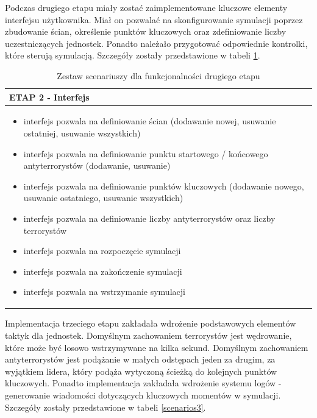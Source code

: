 Podczas drugiego etapu miały zostać zaimplementowane kluczowe elementy interfejsu użytkownika. Miał on pozwalać na skonfigurowanie symulacji poprzez zbudowanie ścian, określenie punktów kluczowych oraz zdefiniowanie liczby uczestniczących jednostek. Ponadto należało przygotować odpowiednie kontrolki, które sterują symulacją. Szczegóły zostały przedstawione w tabeli \ref{scenarios2}. 

\begin{table}
\begin{center}
\begin{tabular}{|p{}|}
\hline
ETAP 2 - Interfejs\\\hline
	\begin{itemize}
		\setlength\itemsep{0pt}
		\item interfejs pozwala na definiowanie ścian (dodawanie nowej, usuwanie ostatniej, usuwanie wszystkich)
		\item interfejs pozwala na definiowanie punktu startowego / końcowego antyterrorystów (dodawanie, usuwanie)
		\item interfejs pozwala na definiowanie punktów kluczowych (dodawanie nowego, usuwanie ostatniego, usuwanie wszystkich)
		\item interfejs pozwala na definiowanie liczby antyterrorystów oraz liczby terrorystów
		\item interfejs pozwala na rozpoczęcie symulacji
		\item interfejs pozwala na zakończenie symulacji
		\item interfejs pozwala na wstrzymanie symulacji
	\end{itemize}
\\\hline
\end{tabular}
\caption {Zestaw scenariuszy dla funkcjonalności drugiego etapu\label{scenarios2}}
\end{center}
\end{table} 

Implementacja trzeciego etapu zakładała wdrożenie podstawowych elementów taktyk dla jednostek. Domyślnym zachowaniem terrorystów jest wędrowanie, które może być losowo wstrzymywane na kilka sekund. Domyślnym zachowaniem antyterrorystów jest podążanie w małych odstępach jeden za drugim, za wyjątkiem lidera, który podąża wytyczoną ścieżką do kolejnych punktów kluczowych. Ponadto implementacja zakładała wdrożenie systemu logów - generowanie wiadomości dotyczących kluczowych momentów w symulacji. Szczegóły zostały przedstawione w tabeli \ref{scenarios3}.


